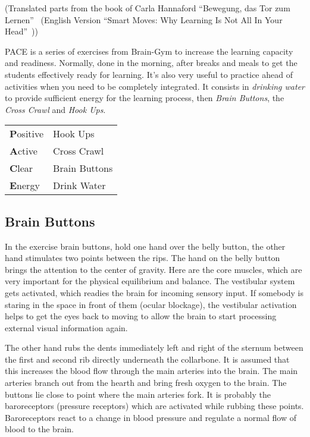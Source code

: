 \documentclass[../main.tex]{subfiles}
\begin{document}
\label{Ex:PACE}

(Translated parts from the book of Carla Hannaford ``Bewegung, das Tor zum Lernen''~\cite{BraingymD}
(English Version ``Smart Moves: Why Learning Is Not All In Your Head''~\cite{BraingymE}))

\vspace{1cm}
PACE is a series of exercises from Brain-Gym  to increase the learning capacity and readiness.
Normally, done in the morning, after breaks and meals to get the students effectively ready for learning.
It's also very useful to practice ahead of activities when you need to be completely integrated.
It consists in \emph{drinking water} to provide sufficient energy for the learning process, then \emph{Brain Buttons}, the \emph{Cross Crawl} and \emph{Hook Ups}.


\vspace{1cm}
\begin{tabular}{ll}
\textbf{P}ositive & Hook Ups\\
\textbf{A}ctive & Cross Crawl\\
\textbf{C}lear & Brain Buttons\\
\textbf{E}nergy & Drink Water\\
\end{tabular}

\subsection{Brain Buttons}

In  the exercise brain buttons, hold one {hand over the belly button}, the other hand stimulates two points between the rips.
The hand on the {belly button} brings the attention to the {center of gravity}.
  Here are the {core muscles}, which are very important for the {physical equilibrium and balance}.
  The vestibular system gets activated, which {readies the brain for incoming sensory input}.
  If somebody is staring in the space in front of them ({ocular blockage}),
  the {vestibular activation} helps to get the {eyes back to moving} to allow the brain to start processing external visual information again.



  The other hand rubs the dents immediately left and right of the sternum between the first and second rib directly underneath the collarbone.
  It is assumed that this {increases the blood} flow through the main arteries into the brain.
  The main arteries branch out from the hearth and bring {fresh oxygen to the brain}.
  The buttons lie close to point where the main arteries fork.
  It is probably the {baroreceptors} (pressure receptors) which are activated while rubbing these {points}.
  Baroreceptors react to a change in blood pressure and regulate a normal flow of blood to the brain.  
\end{document}
